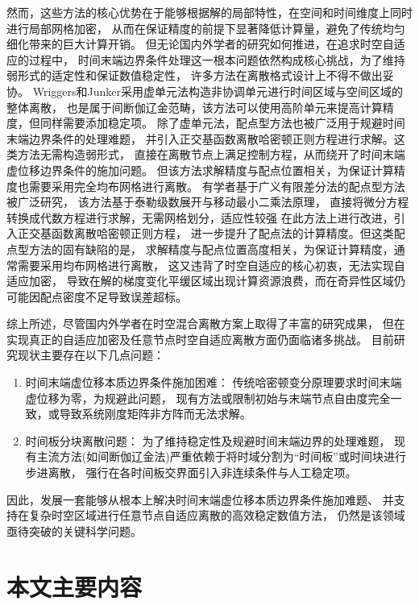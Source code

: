 然而，这些方法的核心优势在于能够根据解的局部特性，在空间和时间维度上同时进行局部网格加密，
从而在保证精度的前提下显著降低计算量，避免了传统均匀细化带来的巨大计算开销。
但无论国内外学者的研究如何推进，在追求时空自适应的过程中，
时间末端边界条件处理这一根本问题依然构成核心挑战，为了维持弱形式的适定性和保证数值稳定性，
许多方法在离散格式设计上不得不做出妥协。
Wriggers和Junker\cite{wriggers2007}采用虚单元法构造非协调单元进行时间区域与空间区域的整体离散，
也是属于间断伽辽金范畴，该方法可以使用高阶单元来提高计算精度，但同样需要添加稳定项。
除了虚单元法，配点型方法也被广泛用于规避时间末端边界条件的处理难题\cite{lxxb2023-001}，
并引入正交基函数离散哈密顿正则方程进行求解。这类方法无需构造弱形式，
直接在离散节点上满足控制方程，从而绕开了时间末端虚位移边界条件的施加问题。
但该方法求解精度与配点位置相关，为保证计算精度也需要采用完全均布网格进行离散。
有学者基于广义有限差分法的配点型方法被广泛研究，
该方法基于泰勒级数展开与移动最小二乘法原理\cite{huang2024space}，
直接将微分方程转换成代数方程进行求解，无需网格划分，适应性较强
在此方法上进行改进，引入正交基函数离散哈密顿正则方程，
进一步提升了配点法的计算精度。但这类配点型方法的固有缺陷的是，
求解精度与配点位置高度相关，为保证计算精度，通常需要采用均布网格进行离散，
这又违背了时空自适应的核心初衷，无法实现自适应加密，
导致在解的梯度变化平缓区域出现计算资源浪费，而在奇异性区域仍可能因配点密度不足导致误差超标。

综上所述，尽管国内外学者在时空混合离散方案上取得了丰富的研究成果，
但在实现真正的自适应加密及任意节点时空自适应离散方面仍面临诸多挑战。
目前研究现状主要存在以下几点问题：
\begin{enumerate}
\setlength{\itemsep}{0pt}
\setlength{\parsep}{0pt}
\setlength{\parskip}{0pt}
\item 时间末端虚位移本质边界条件施加困难：
传统哈密顿变分原理要求时间末端虚位移为零，为规避此问题，
现有方法或限制初始与末端节点自由度完全一致，或导致系统刚度矩阵非方阵而无法求解。
\item 时间板分块离散问题：
为了维持稳定性及规避时间末端边界的处理难题，
现有主流方法(如间断伽辽金法)严重依赖于将时域分割为“时间板”或时间块进行步进离散，
强行在各时间板交界面引入非连续条件与人工稳定项。
\end{enumerate}

因此，发展一套能够从根本上解决时间末端虚位移本质边界条件施加难题、
并支持在复杂时空区域进行任意节点自适应离散的高效稳定数值方法，
仍然是该领域亟待突破的关键科学问题。

\section{本文主要内容}

